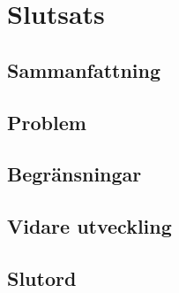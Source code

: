 \documentclass{kaumasters} %
\begin{document}
\newpage

\chapter{Slutsats}
\section{Sammanfattning}
\section{Problem}
\section{Begränsningar}
\section{Vidare utveckling}
\section{Slutord}

\restoregeometry%
\end{document}
